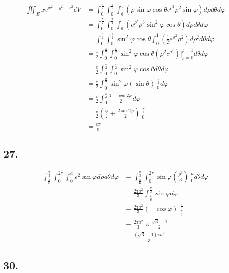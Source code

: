 \documentclass{article}
\begin{document}
  $$\begin{aligned}
    \iiint_E xe^{x^2+y^2+z^2} dV &= \int_0^{\frac \pi 2} \int_0^{\frac \pi 2} \int_0^1 (\rho \sin \varphi \cos \theta e^{\rho^2} \rho^2 \sin \varphi) d\rho d\theta d\varphi \\
    &= \int_0^{\frac \pi 2} \int_0^{\frac \pi 2} \int_0^1 (e^{\rho^2} \rho^3 \sin^2 \varphi \cos \theta) d\rho d\theta d\varphi \\
    &= \int_0^{\frac \pi 2} \int_0^{\frac \pi 2} \sin^2 \varphi \cos \theta \int_0^1 (\frac 1 2 e^{\rho^2} \rho^2) d\rho^2 d\theta d\varphi \\
    &= \frac 1 2 \int_0^{\frac \pi 2} \int_0^{\frac \pi 2} \sin^2 \varphi \cos \theta (\rho^2 e^{\rho^2})\biggl|_{\rho=0}^{\rho=1} d\theta d\varphi \\
    &= \frac e 2 \int_0^{\frac \pi 2} \int_0^{\frac \pi 2} \sin^2 \varphi \cos \theta d\theta d\varphi \\
    &= \frac e 2 \int_0^{\frac \pi 2} \sin^2 \varphi (\sin \theta)\biggl|_0^{\frac \pi 2} d\varphi \\
    &= \frac e 2 \int_0^{\frac \pi 2} \frac{1 - \cos 2\varphi}{2} d\varphi \\
    &= \frac e 2 (\frac \varphi 2 + \frac{2\sin 2\varphi }{2})\biggl|_0^{\frac \pi 2} \\
    &= \frac{e\pi}{8} 
  \end{aligned}$$

  \subsection*{27. }

  $$\begin{aligned}
    \int_{\frac \pi 6}^{\frac \pi 3} \int_0^{2\pi} \int_0^a \rho^2 \sin \varphi d\rho d\theta d\varphi &= \int_{\frac \pi 6}^{\frac \pi 3} \int_0^{2\pi} \sin \varphi (\frac{\rho^3}{3})\biggl|_0^a d\theta d\varphi \\
    &= \frac{2\pi a^2}{3} \int_{\frac \pi 6}^{\frac \pi 3} \sin \varphi d\varphi \\
    &= \frac{2\pi a^2}{3} (-\cos \varphi)\biggl|_{\frac \pi 6}^{\frac \pi 3} \\
    &= \frac{2\pi a^2}{3} \times \frac{\sqrt 3 - 1}{2} \\
    &= \frac{(\sqrt 3 - 1)\pi a^2}{3}
  \end{aligned}$$

  \subsection*{30. }
\end{document}
